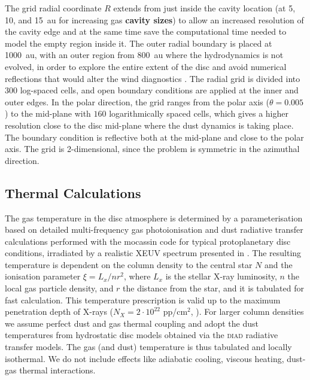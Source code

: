 \documentclass[fleqn,usenatbib]{mnras}
\begin{document}
        The grid radial coordinate $R$ extends from just inside the cavity location (at 5, 10, and \SI{15}{au} for increasing gas \textbf{cavity sizes}) to allow an increased resolution of the cavity edge and at the same time save the computational time needed to model the empty region inside it. The outer radial boundary is placed at \SI{1000}{au}, with an outer region from \SI{800}{au} where the hydrodynamics is not evolved, in order to explore the entire extent of the disc and avoid numerical reflections that would alter the wind diagnostics \citep{Picogna2019}. The radial grid is divided into 300 log-spaced cells, and open boundary conditions are applied at the inner and outer edges.
        In the polar direction, the grid ranges from the polar axis ($\theta = 0.005$) to the mid-plane with $160$ logarithmically spaced cells, which gives a higher resolution close to the disc mid-plane where the dust dynamics is taking place. The boundary condition is reflective both at the mid-plane and close to the polar axis. The grid is 2-dimensional, since the problem is symmetric in the azimuthal direction.
        
    \subsection{Thermal Calculations}\label{sec:mocassin}

        The gas temperature in the disc atmosphere is determined by a parameterisation based on detailed multi-frequency gas photoionisation and dust radiative transfer calculations performed with the {\sc mocassin} code \citep{MOCASSIN1,MOCASSIN2,MOCASSIN3} for typical protoplanetary disc conditions, irradiated by a realistic XEUV spectrum presented in \citet{Ercolano2008,Ercolano2009}.
        The resulting temperature is dependent on the column density to the central star $N$ and the ionisation parameter $\xi=L_x/nr^2$, where $L_x$ is the stellar X-ray luminosity, $n$ the local gas particle density, and $r$ the distance from the star, and it is tabulated for fast calculation.
        This temperature prescription is valid up to the maximum penetration depth of X-rays ($N_X = 2\cdot10^{22}$ pp/cm$^2$, \cite{Ercolano2009}).
        For larger column densities we assume perfect dust and gas thermal coupling and adopt the dust temperatures from hydrostatic disc models obtained via the \textsc{diad} radiative transfer models.
        The gas (and dust) temperature is thus tabulated and locally isothermal. We do not include effects like adiabatic cooling, viscous heating, dust-gas thermal interactions.
       
\end{document}
